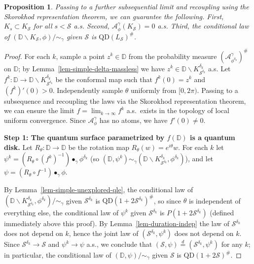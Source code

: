 \documentclass[10pt,a4paper]{amsart}
\newtheorem{proposition}{Proposition}
\newcommand{\D}{\mathbb{D}}
\newcommand{\QD}{\mathrm{QD}}
\newcommand{\cA}{\mathcal{A}}
\newcommand{\qduration}{\mathcal{S}}
\begin{document}
\begin{proposition}\label{prop-simple-markov}
Passing to a further subsequential limit and recoupling using the Skorokhod representation theorem, we can guarantee the following. First, $K_s \subset K_\qduration$ for all $s < \qduration$ a.s. Second, $\cA^\gamma_\phi(K_\qduration) = 0$ a.s. Third, the conditional law of $(\D \backslash K_\qduration, \phi)/{\sim_\gamma}$ given $\qduration$ is $\QD(L_\qduration)^\#$.
\end{proposition}

\begin{proof}
\noindent
    For each $k$, sample a point $z^k \in \D$ from the probability measure $(\cA^\gamma_{\phi^{\delta_k}})^\#$ on $\D$; by Lemma~\ref{lem-simple-delta-massless} we have $z^k \in \D \backslash K^{\delta_k}_{\qduration^{\delta_k}}$ a.s. Let $f^k: \D \to \D \backslash K^{\delta_k}_{\qduration^{\delta_k}}$ be the conformal map such that $f^k(0) = z^k$ and $(f^k)'(0) > 0$. Independently sample $\theta$ uniformly from $[0,2\pi)$. 
    Passing to a subsequence and recoupling the laws via the Skorokhod representation theorem, we can ensure the limit $f = \lim_{k \to \infty} f^k$ a.s.\ exists in the topology of local uniform convergence. Since $\cA^\gamma_\phi$ has no atoms, we have $f'(0) \neq 0$. 
    \medskip 

    \noindent 
    \textbf{Step 1: The quantum surface parametrized by $f(\D)$ is a quantum disk.} 
   Let $R_\theta: \D \to \D$ be the rotation map $R_\theta(w) = e^{i\theta}w$. For each $k$ let $\psi^k = (R_{\theta} \circ (f^k)^{-1}) \bullet_\gamma \phi^{\delta_k}$ (so $(\D, \psi^k) \sim_\gamma (\D \backslash K^{\delta_k}_{\qduration^{\delta_k}}, \phi^{\delta_k})$), and let $\psi = (R_{\theta} \circ f^{-1}) \bullet_\gamma \phi$.

    By Lemma~\ref{lem-simple-unexplored-qle}, the conditional law of $(\D \backslash K^{\delta_k}_{\qduration^{\delta_k}}, \phi^{\delta_k})/{\sim_\gamma}$ given $\qduration^{\delta_k}$ is $\QD(1 + 2 \qduration^{\delta_k})^\#$, so since $\theta$ is independent of everything else, the conditional law of $\psi^k$ given $\qduration^{\delta_k}$ is $P(1 + 2 \qduration^{\delta_k})$ (defined immediately above this proof). 
    By Lemma~\ref{lem-duration-indep} the law of $\qduration^{\delta_k}$ does not depend on $k$, hence the joint law of $(\qduration^{\delta_k}, \psi^k)$ does not depend on $k$. Since $\qduration^{\delta_k} \to \qduration$ and $\psi^k \to \psi$ a.s., we conclude that $(\qduration, \psi) \stackrel d= (\qduration^{\delta_k}, \psi^k)$ for any $k$; in particular, the conditional law of $(\D, \psi)/{\sim_\gamma}$ given $\qduration$ is $\QD(1+2\qduration)^\#$. 


\end{proof}
\end{document}
